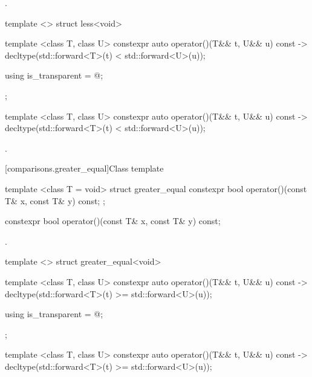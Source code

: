 \begin{itemdescr}
\pnum\returns {}.
\end{itemdescr}

%
\begin{itemdecl}
template <> struct less<void> {
  template <class T, class U> constexpr auto operator()(T&& t, U&& u) const
    -> decltype(std::forward<T>(t) < std::forward<U>(u));

  using is_transparent = @\unspec@;
};
\end{itemdecl}

%
\begin{itemdecl}
template <class T, class U> constexpr auto operator()(T&& t, U&& u) const
    -> decltype(std::forward<T>(t) < std::forward<U>(u));
\end{itemdecl}

\begin{itemdescr}
\pnum\returns {}.
\end{itemdescr}

[comparisons.greater_equal]{Class template }

%
\begin{itemdecl}
template <class T = void> struct greater_equal {
  constexpr bool operator()(const T& x, const T& y) const;
};
\end{itemdecl}

%
\begin{itemdecl}
constexpr bool operator()(const T& x, const T& y) const;
\end{itemdecl}

\begin{itemdescr}
\pnum\returns {}.
\end{itemdescr}

%
\begin{itemdecl}
template <> struct greater_equal<void> {
  template <class T, class U> constexpr auto operator()(T&& t, U&& u) const
    -> decltype(std::forward<T>(t) >= std::forward<U>(u));

  using is_transparent = @\unspec@;
};
\end{itemdecl}

%
\begin{itemdecl}
template <class T, class U> constexpr auto operator()(T&& t, U&& u) const
    -> decltype(std::forward<T>(t) >= std::forward<U>(u));
\end{itemdecl}


